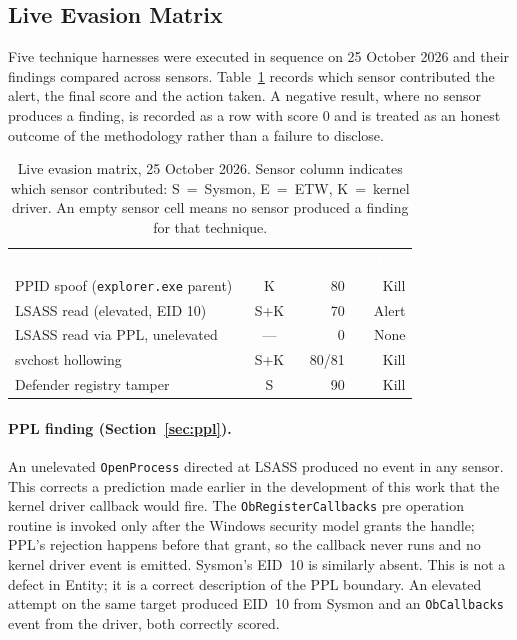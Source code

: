 \documentclass[10pt,twocolumn,letterpaper]{article}
\newcommand{\code}[1]{\texttt{\small #1}}
\newcommand{\Thd}[1]{\textcolor{white}{\sffamily\bfseries #1}}
\newcommand{\headrow}{\rowcolor{TableHead}}
\begin{document}
\subsection{Live Evasion Matrix}
\label{sec:evasion}

Five technique harnesses were executed in sequence on 25 October 2026 and their findings
compared across sensors. Table~\ref{tbl:evasion} records which sensor contributed the
alert, the final score and the action taken. A negative result, where no sensor produces
a finding, is recorded as a row with score 0 and is treated as an honest outcome of the
methodology rather than a failure to disclose.

\begin{table}[t]
\centering
\caption{Live evasion matrix, 25 October 2026. Sensor column indicates which sensor
contributed: S~=~Sysmon, E~=~ETW, K~=~kernel driver. An empty sensor cell means no
sensor produced a finding for that technique.}
\label{tbl:evasion}
\small
\renewcommand{\arraystretch}{1.12}
\begin{tabularx}{\columnwidth}{@{}>{\raggedright\arraybackslash}Xcrr@{}}
\headrow \Thd{Technique} & \Thd{Sensor} & \Thd{Score} & \Thd{Action} \\
PPID spoof (\texttt{explorer.exe} parent) & K & 80 & Kill \\
LSASS read (elevated, EID 10)              & S+K & 70 & Alert \\
LSASS read via PPL, unelevated             & --- & 0  & None \\
svchost hollowing                          & S+K & 80/81 & Kill \\
Defender registry tamper                   & S & 90 & Kill \\
\bottomrule
\end{tabularx}
\end{table}

\paragraph{PPL finding (Section~\ref{sec:ppl}).}
An unelevated \code{OpenProcess} directed at LSASS produced no event in any sensor. This
corrects a prediction made earlier in the development of this work that the kernel driver
callback would fire. The \code{ObRegisterCallbacks} pre operation routine is invoked only
after the Windows security model grants the handle; PPL's rejection happens before that
grant, so the callback never runs and no kernel driver event is emitted. Sysmon's EID~10
is similarly absent. This is not a defect in Entity; it is a correct description of the
PPL boundary. An elevated attempt on the same target produced EID~10 from Sysmon and an
\code{ObCallbacks} event from the driver, both correctly scored.
\label{sec:ppl}
\end{document}
